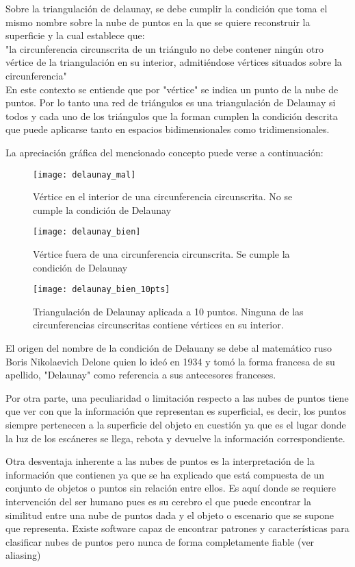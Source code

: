 Sobre la triangulación de delaunay, se debe cumplir la condición que toma el mismo nombre sobre la nube de puntos en la que se quiere reconstruir la superficie y la cual establece que:
\\
"la circunferencia circunscrita de un triángulo no debe contener ningún otro vértice de la triangulación en su interior, admitiéndose vértices situados sobre la circunferencia"
\\
En este contexto se entiende que por "vértice" se indica un punto de la nube de puntos.
Por lo tanto una red de triángulos es una triangulación de Delaunay si todos y cada uno de los triángulos que la forman cumplen la condición descrita que puede aplicarse tanto en espacios bidimensionales como tridimensionales.

La apreciación gráfica del mencionado concepto puede verse a continuación:
\begin{figure}[!htb]
  \texttt{[image: delaunay\_mal]}
  \caption{Vértice en el interior de una circunferencia circunscrita. No se cumple la condición de Delaunay}\label{fig:del_mal}
\endminipage\hfill
{}
  \texttt{[image: delaunay\_bien]}
  \caption{Vértice fuera de una circunferencia circunscrita. Se cumple la condición de Delaunay}\label{fig:del_bien}
\endminipage\hfill
{}
  \texttt{[image: delaunay\_bien\_10pts]}
	\caption{Triangulación de Delaunay aplicada a 10 puntos. Ninguna de las circunferencias circunscritas contiene vértices en su interior.}\label{fig:del_bien_10pts}
\endminipage
\end{figure}
El origen del nombre de la condición de Delauany se debe al matemático ruso Boris Nikolaevich Delone quien lo ideó en 1934 y tomó la forma francesa de su apellido, "Delaunay" como referencia a sus antecesores franceses.


Por otra parte, una peculiaridad o limitación respecto a las nubes de puntos tiene que ver con que la
información que representan es superficial, es decir, los puntos siempre pertenecen a la superficie del
objeto en cuestión ya que es el lugar donde la luz de los escáneres se llega, rebota y devuelve la
información correspondiente.

Otra desventaja inherente a las nubes de puntos es la interpretación de la información que contienen ya
que se ha explicado que está compuesta de un conjunto de objetos o puntos sin relación entre ellos. Es
aquí donde se requiere intervención del ser humano pues es su cerebro el que puede encontrar la similitud
entre una nube de puntos dada y el objeto o escenario que se supone que representa. Existe software capaz
de encontrar patrones y características para clasificar nubes de puntos pero nunca de forma
completamente fiable (ver aliasing)

